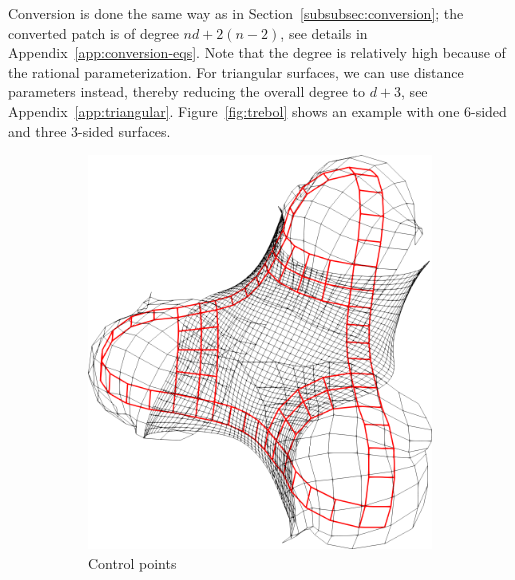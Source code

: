 \documentclass[9pt,academicons]{article}
\begin{document}
Conversion is done the same way as in Section~\ref{subsubsec:conversion};
the converted patch is of degree $nd+2(n-2)$,
see details in Appendix~\ref{app:conversion-eqs}.
Note that the degree is relatively high because of the rational parameterization.
For triangular surfaces, we can use distance parameters instead,
thereby reducing the overall degree to $d+3$, see Appendix~\ref{app:triangular}.
Figure~\ref{fig:trebol} shows an example with one 6-sided and three 3-sided surfaces.
\begin{figure}
  \begin{subfigure}{.24\textwidth}
    \centering
    \includegraphics[height=.2\textheight]{images/trebol3-cnet.png}
    \caption{Control points}
    \label{fig:trebol-cnet}
  \end{subfigure}
  \hfill
  \begin{subfigure}{.24\textwidth}
    \centering

\end{subfigure}
\end{figure}
\end{document}
